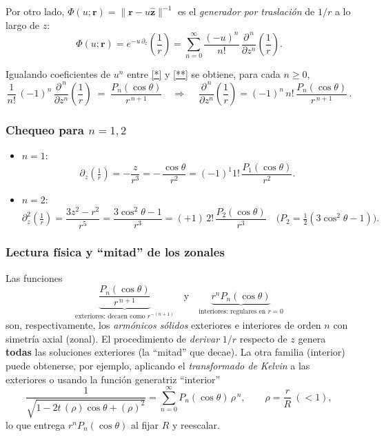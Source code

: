 \documentclass{article}
\begin{document}
Por otro lado, $\Phi(u;\mathbf r)=\lVert \mathbf r-u\hat{\mathbf z}\rVert^{-1}$ es el \emph{generador por traslación} de $1/r$ a lo largo de $z$:
\[
\Phi(u;\mathbf r)=e^{-u\,\partial_{z}}\!\left(\frac{1}{r}\right)
=\sum_{n=0}^{\infty}\frac{(-u)^{n}}{n!}\,\frac{\partial^{\,n}}{\partial z^{n}}\!\left(\frac{1}{r}\right).
\tag{$\ast\ast$}
\]

Igualando coeficientes de $u^{n}$ entre \eqref{*} y \eqref{**} se obtiene, para cada $n\ge 0$,
\[
\frac{1}{n!}\,(-1)^{n}\,\frac{\partial^{\,n}}{\partial z^{n}}\!\left(\frac{1}{r}\right)
\;=\;\frac{P_n(\cos\theta)}{r^{\,n+1}}
\quad\Longrightarrow\quad
\boxed{\ \frac{\partial^{\,n}}{\partial z^{n}}\!\left(\frac{1}{r}\right)
= (-1)^{n}\,n!\,\frac{P_n(\cos\theta)}{r^{\,n+1}}\, }.
\]

\subsubsection*{Chequeo para $n=1,2$}
\begin{itemize}
\item $n=1$:
\[
\partial_z\!\left(\tfrac{1}{r}\right)=-\frac{z}{r^{3}}
=-\,\frac{\cos\theta}{r^{2}}
=(-1)^1 1!\,\frac{P_1(\cos\theta)}{r^{2}}.
\]
\item $n=2$:
\[
\partial_z^{2}\!\left(\tfrac{1}{r}\right)
=\frac{3z^{2}-r^{2}}{r^{5}}
=\frac{3\cos^{2}\theta-1}{r^{3}}
=(+1)\,2!\,\frac{P_2(\cos\theta)}{r^{3}}\quad
\Big(P_2=\tfrac{1}{2}(3\cos^{2}\theta-1)\Big).
\]
\end{itemize}

\subsubsection*{Lectura física y “mitad” de los zonales}
Las funciones
\[
\underbrace{\frac{P_n(\cos\theta)}{r^{\,n+1}}}_{\text{exteriores: decaen como } r^{-(n+1)}}
\quad\text{y}\quad
\underbrace{r^{n}P_n(\cos\theta)}_{\text{interiores: regulares en } r=0}
\]
son, respectivamente, los \emph{armónicos sólidos} exteriores e interiores de orden $n$ con simetría axial (zonal).  
El procedimiento de \emph{derivar} $1/r$ respecto de $z$ genera \textbf{todas} las soluciones exteriores (la “mitad” que decae). La otra familia (interior) puede obtenerse, por ejemplo, aplicando el \emph{transformado de Kelvin} a las exteriores o usando la función generatriz “interior”
\[
\frac{1}{\sqrt{1-2t\,(\rho)\cos\theta+(\rho)^{2}}}
=\sum_{n=0}^{\infty}P_n(\cos\theta)\,\rho^{\,n},\qquad \rho=\frac{r}{R}\ (<1),
\]
lo que entrega $r^{n}P_n(\cos\theta)$ al fijar $R$ y reescalar.
  
\end{document}
